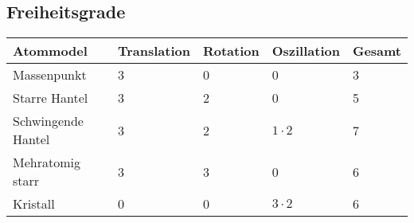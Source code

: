 \subsection{Freiheitsgrade}				%
	\begin{tabular}{|l|m{3cm}|m{3cm}|m{3cm}|m{3cm}|}
		\hline 
	\textbf{Atommodel}	& \textbf{Translation} & \textbf{Rotation}  & \textbf{Oszillation} & \textbf{Gesamt}    \\ 
		\hline 
		Massenpunkt & 3 & 0 & 0 & 3   \\ 
		\hline 
		Starre Hantel& 3 & 2 & 0 & 5   \\ 
		\hline 
		Schwingende Hantel& 3 & 2 & $1\cdot 2$ & 7   \\ 
		\hline 
		Mehratomig starr& 3 & 3 & 0 & 6    \\ 
		\hline 
		Kristall& 0 & 0 & $3\cdot 2$ & 6    \\ 
		\hline 
	\end{tabular} 




